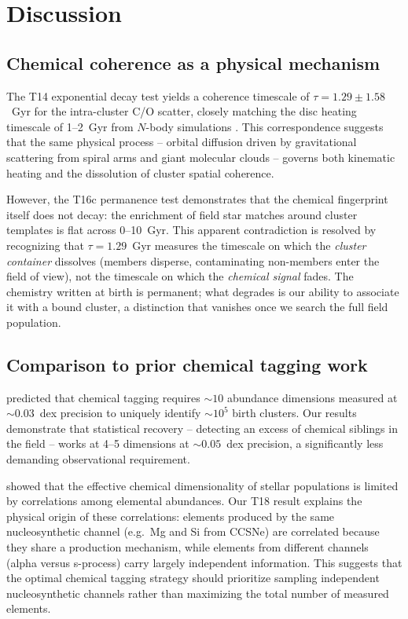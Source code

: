 \documentclass[fleqn,usenatbib]{mnras}
\newcommand{\co}{C/O\xspace}
\begin{document}
\section{Discussion}
\label{sec:discussion}

\subsection{Chemical coherence as a physical mechanism}

The T14 exponential decay test yields a coherence timescale of $\tau = 1.29 \pm 1.58$~Gyr for the intra-cluster \co scatter, closely matching the disc heating timescale of 1--2~Gyr from $N$-body simulations \citep{BinneyTremaine2008}.
This correspondence suggests that the same physical process -- orbital diffusion driven by gravitational scattering from spiral arms and giant molecular clouds -- governs both kinematic heating and the dissolution of cluster spatial coherence.

However, the T16c permanence test demonstrates that the chemical fingerprint itself does not decay: the enrichment of field star matches around cluster templates is flat across 0--10~Gyr.
This apparent contradiction is resolved by recognizing that $\tau = 1.29$~Gyr measures the timescale on which the \emph{cluster container} dissolves (members disperse, contaminating non-members enter the field of view), not the timescale on which the \emph{chemical signal} fades.
The chemistry written at birth is permanent; what degrades is our ability to associate it with a bound cluster, a distinction that vanishes once we search the full field population.

\subsection{Comparison to prior chemical tagging work}

\citet{BlandHawthorn2010} predicted that chemical tagging requires ${\sim}10$ abundance dimensions measured at ${\sim}0.03$~dex precision to uniquely identify ${\sim}10^5$ birth clusters.
Our results demonstrate that statistical recovery -- detecting an excess of chemical siblings in the field -- works at 4--5 dimensions at ${\sim}0.05$~dex precision, a significantly less demanding observational requirement.

\citet{Ting2015} showed that the effective chemical dimensionality of stellar populations is limited by correlations among elemental abundances.
Our T18 result explains the physical origin of these correlations: elements produced by the same nucleosynthetic channel (e.g.\ Mg and Si from CCSNe) are correlated because they share a production mechanism, while elements from different channels (alpha versus s-process) carry largely independent information.
This suggests that the optimal chemical tagging strategy should prioritize sampling independent nucleosynthetic channels rather than maximizing the total number of measured elements.
\end{document}
